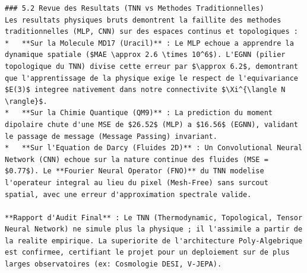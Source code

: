 \documentclass[11pt,a4paper]{article}
\begin{document}
\begin{lstlisting}[language={}, caption={}, basicstyle=\ttfamily\footnotesize, breaklines=true]
### 5.2 Revue des Resultats (TNN vs Methodes Traditionnelles)
Les resultats physiques bruts demontrent la faillite des methodes traditionnelles (MLP, CNN) sur des espaces continus et topologiques :
*   **Sur la Molecule MD17 (Uracil)** : Le MLP echoue a apprendre la dynamique spatiale ($MAE \approx 2.6 \times 10^6$). L'EGNN (pilier topologique du TNN) divise cette erreur par $\approx 6.2$, demontrant que l'apprentissage de la physique exige le respect de l'equivariance $E(3)$ integree nativement dans notre connectivite $\Xi^{\langle N \rangle}$.
*   **Sur la Chimie Quantique (QM9)** : La prediction du moment dipolaire chute d'une MSE de $26.52$ (MLP) a $16.56$ (EGNN), validant le passage de message (Message Passing) invariant.
*   **Sur l'Equation de Darcy (Fluides 2D)** : Un Convolutional Neural Network (CNN) echoue sur la nature continue des fluides (MSE = $0.77$). Le **Fourier Neural Operator (FNO)** du TNN modelise l'operateur integral au lieu du pixel (Mesh-Free) sans surcout spatial, avec une erreur d'approximation spectrale valide.

**Rapport d'Audit Final** : Le TNN (Thermodynamic, Topological, Tensor Neural Network) ne simule plus la physique ; il l'assimile a partir de la realite empirique. La superiorite de l'architecture Poly-Algebrique est confirmee, certifiant le projet pour un deploiement sur de plus larges observatoires (ex: Cosmologie DESI, V-JEPA).

\end{lstlisting}
\end{document}
